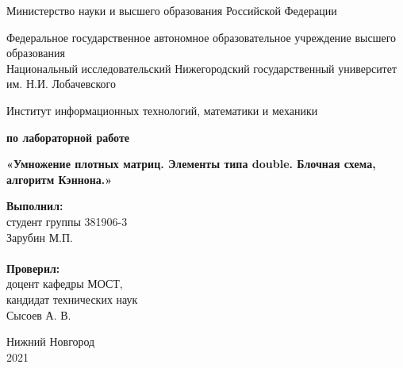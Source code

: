 \documentclass{report}
\begin{document}
\begin{titlepage}

\begin{center}
Министерство науки и высшего образования Российской Федерации
\end{center}

\begin{center}
Федеральное государственное автономное образовательное учреждение высшего образования \\
Национальный исследовательский Нижегородский государственный университет им. Н.И. Лобачевского
\end{center}

\begin{center}
Институт информационных технологий, математики и механики
\end{center}

\vspace{4em}

\begin{center}
\textbf{ по лабораторной работе} \\
\end{center}
\begin{center}
\textbf{\Large«Умножение плотных матриц. Элементы типа double. Блочная схема, алгоритм Кэннона.»} \\
\end{center}

\vspace{4em}

\newbox{\lbox}
\newlength{\maxl}
\setlength{\maxl}{\wd\lbox}
\hfill\parbox{7cm}{
\hspace*{5cm}\hspace*{-5cm}\textbf{Выполнил:} \\ студент группы 381906-3 \\ Зарубин М.П.\\
\\
\hspace*{5cm}\hspace*{-5cm}\textbf{Проверил:}\\ доцент кафедры МОСТ, \\ кандидат технических наук \\ Сысоев А. В.\\
}
\vspace{\fill}

\begin{center} Нижний Новгород \\ 2021 \end{center}

\end{titlepage}
\end{document}
